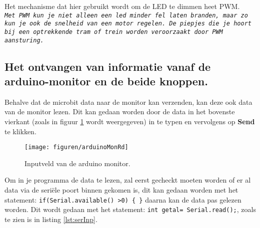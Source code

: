 	
	
	\begin{comment}
		
		
		
		Gebruik de mogelijkheden van Arduino (en niet Google) om onderstaande vragen te beantwoorden, denk aan \colorbox{mygray}{\textbf{Ctrl + Shift + F}} en de commentaren die al in de code staan:
		Welke regel (welk commando) zorgt voor dit Fade effect? 
		
		
		\vspace{1cm}
		\hrule
		\vspace{1cm}
		Het mechanisme dat hier gebruikt wordt heet PWM. Waar staat de afkorting voor en wat doet het?
		\vspace{1cm}
		\hrule
		~\\    
		\hrule
		\vspace{0.5cm}
	\end{comment}
	Het mechanisme dat hier gebruikt wordt om de LED te dimmen heet PWM.\\
	{ \texttt{\textit{Met PWM kun je niet alleen een led minder fel laten branden, maar zo kun je ook de snelheid van een motor regelen. De piepjes die je hoort bij een optrekkende tram of trein worden veroorzaakt door PWM aansturing.}}}

\subsection{Het ontvangen van informatie vanaf de arduino-monitor en de beide knoppen.}

Behalve dat de microbit data naar de monitor kan verzenden, kan deze ook data van de  monitor lezen.
Dit kan gedaan worden door de data in het bovenste vierkant (zoals in figuur \ref{fig:ardMonRd} wordt weergegeven) in te typen en vervolgens op \textbf{Send} te klikken.
\begin{figure}[h!]
	\captionsetup{justification=centering}
	\texttt{[image: figuren/arduinoMonRd]}
	\centering
	\caption{Inputveld van de arduino monitor.}
	\label{fig:ardMonRd}
\end{figure}
Om in je programma de data te lezen, zal eerst gecheckt moeten worden of er al data via de seriële poort binnen gekomen is, dit kan gedaan worden met het statement:  \texttt{if(\textcolor{BurntOrange}{Serial.available}() \textgreater 0) \{ \}} daarna kan de data pas gelezen worden. 
Dit wordt gedaan met het statement:   \texttt{int getal=\textcolor{BurntOrange}{ Serial.read}();}, zoals te zien is in listing \ref{lst:serInp}.

